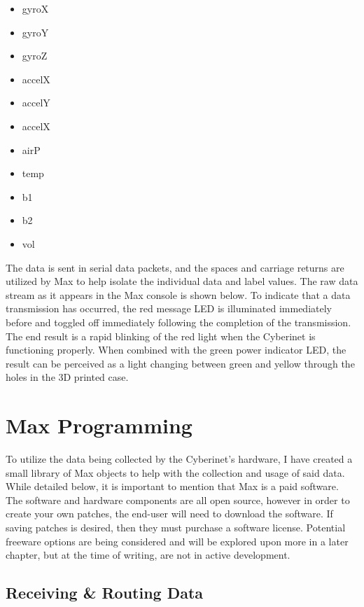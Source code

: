\begin{itemize}
    \item gyroX
    \item gyroY
    \item gyroZ
    \item accelX
    \item accelY
    \item accelX
    \item airP
    \item temp
    \item b1
    \item b2
    \item vol
\end{itemize}

The data is sent in serial data packets, and the spaces and carriage returns are utilized by Max to help isolate the individual data and label values. The raw data stream as it appears in the Max console is shown below. To indicate that a data transmission has occurred, the red message LED is illuminated immediately before and toggled off immediately following the completion of the transmission. The end result is a rapid blinking of the red light when the Cyberinet is functioning properly. When combined with the green power indicator LED, the result can be perceived as a light changing between green and yellow through the holes in the 3D printed case.


\section{Max Programming}

To utilize the data being collected by the Cyberinet’s hardware, I have created a small library of Max objects to help with the collection and usage of said data. While detailed below, it is important to mention that Max is a paid software. The software and hardware components are all open source, however in order to create your own patches, the end-user will need to download the software. If saving patches is desired, then they must purchase a software license. Potential freeware options are being considered and will be explored upon more in a later chapter, but at the time of writing, are not in active development.

\subsection{Receiving \& Routing Data}


